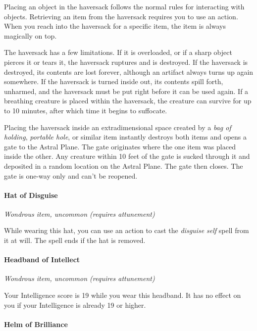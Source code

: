 \documentclass[
]{article}
\begin{document}
Placing an object in the haversack follows the normal rules for
interacting with objects. Retrieving an item from the haversack requires
you to use an action. When you reach into the haversack for a specific
item, the item is always magically on top.

The haversack has a few limitations. If it is overloaded, or if a sharp
object pierces it or tears it, the haversack ruptures and is destroyed.
If the haversack is destroyed, its contents are lost forever, although
an artifact always turns up again somewhere. If the haversack is turned
inside out, its contents spill forth, unharmed, and the haversack must
be put right before it can be used again. If a breathing creature is
placed within the haversack, the creature can survive for up to 10
minutes, after which time it begins to suffocate.

Placing the haversack inside an extradimensional space created by a
\emph{bag of holding}, \emph{portable hole}, or similar item instantly
destroys both items and opens a gate to the Astral Plane. The gate
originates where the one item was placed inside the other. Any creature
within 10 feet of the gate is sucked through it and deposited in a
random location on the Astral Plane. The gate then closes. The gate is
one-way only and can't be reopened.

\hypertarget{hat-of-disguise}{%
\paragraph{Hat of Disguise}\label{hat-of-disguise}}

\emph{Wondrous item, uncommon (requires attunement)}

While wearing this hat, you can use an action to cast the \emph{disguise
self} spell from it at will. The spell ends if the hat is removed.

\hypertarget{headband-of-intellect}{%
\paragraph{Headband of Intellect}\label{headband-of-intellect}}

\emph{Wondrous item, uncommon (requires attunement)}

Your Intelligence score is 19 while you wear this headband. It has no
effect on you if your Intelligence is already 19 or higher.

\hypertarget{helm-of-brilliance}{%
\paragraph{Helm of Brilliance}\label{helm-of-brilliance}}
\end{document}
